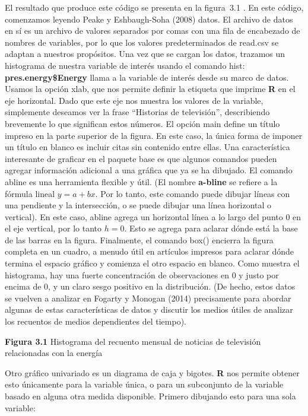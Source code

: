 \documentclass[
]{book}
\begin{document}
El resultado que produce este código se presenta en la figura  3.1 . En este código, comenzamos leyendo Peake y Eshbaugh-Soha (2008) datos. El archivo de datos en sí es un archivo de valores separados por comas con una fila de encabezado de nombres de variables, por lo que los valores predeterminados de read.csv se adaptan a nuestros propósitos. Una vez que se cargan los datos, trazamos un histograma de nuestra variable de interés usando el comando hist: \textbf{pres.energy\$Energy} llama a la variable de interés desde su marco de datos. Usamos la opción xlab, que nos permite definir la etiqueta que imprime \textbf{R} en el eje horizontal. Dado que este eje nos muestra los valores de la variable, simplemente deseamos ver la frase ``Historias de televisión'', describiendo brevemente lo que significan estos números. El opción main define un título impreso en la parte superior de la figura. En este caso, la única forma de imponer un título en blanco es incluir citas sin contenido entre ellas. Una característica interesante de graficar en el paquete base es que algunos comandos pueden agregar información adicional a una gráfica que ya se ha dibujado. El comando abline es una herramienta flexible y útil. (El nombre \textbf{a-bline} se refiere a la fórmula lineal \(y  =  a + bx\). Por lo tanto, este comando puede dibujar líneas con una pendiente y la intersección, o se puede dibujar una línea horizontal o vertical). En este caso, abline agrega un horizontal línea a lo largo del punto 0 en el eje vertical, por lo tanto \(h = 0\). Esto se agrega para aclarar dónde está la base de las barras en la figura. Finalmente, el comando box() encierra la figura completa en un cuadro, a menudo útil en artículos impresos para aclarar dónde termina el espacio gráfico y comienza el otro espacio en blanco. Como muestra el histograma, hay una fuerte concentración de observaciones en 0 y justo por encima de 0, y un claro sesgo positivo en la distribución. (De hecho, estos datos se vuelven a analizar en Fogarty y Monogan (2014) precisamente para abordar algunas de estas características de datos y discutir los medios útiles de analizar los recuentos de medios dependientes del tiempo).

\textbf{Figura 3.1} Histograma del recuento mensual de noticias de televisión relacionadas con la energía

Otro gráfico univariado es un diagrama de caja y bigotes. \textbf{R} nos permite obtener esto únicamente para la variable única, o para un subconjunto de la variable basado en alguna otra medida disponible. Primero dibujando esto para una sola variable:
\end{document}
